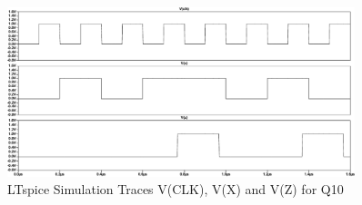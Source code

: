 \begin{figure}[!ht]
    \centering
    \includegraphics[width=0.9\textwidth]{inc/Q/Q10/Q10.pdf}
    \caption{LTspice Simulation Traces V(CLK), V(X) and V(Z) for Q10}\label{fig:Q10}
\end{figure}\FloatBarrier 
